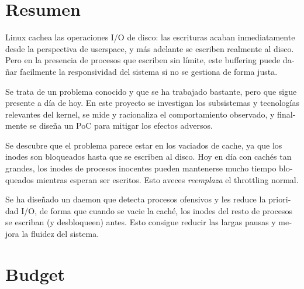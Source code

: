 \documentclass[a4paper,12pt]{article}
\begin{document}
\clearpage
{}
{}
\section*{Resumen}

\begin{otherlanguage}{spanish}
Linux cachea las operaciones I/O de disco: las escrituras acaban inmediatamente desde la perspectiva de userspace, y más adelante se escriben realmente al disco. Pero en la presencia de procesos que escriben sin límite, este buffering puede dañar facilmente la responsividad del sistema si no se gestiona de forma justa.

Se trata de un problema conocido y que se ha trabajado bastante, pero que sigue presente a día de hoy. En este proyecto se investigan los subsistemas y tecnologías relevantes del kernel, se mide y racionaliza el comportamiento observado, y finalmente se diseña un PoC para mitigar los efectos adversos.

Se descubre que el problema parece estar en los vaciados de cache, ya que los inodes son bloqueados hasta que se escriben al disco. Hoy en día con cachés tan grandes, los inodes de procesos inocentes pueden mantenerse mucho tiempo bloqueados mientras esperan ser escritos. Esto aveces \emph{reemplaza} el throttling normal.

Se ha diseñado un daemon que detecta procesos ofensivos y les reduce la prioridad I/O, de forma que cuando se vacie la caché, los inodes del resto de procesos se escriban (y desbloqueen) antes. Esto consigue reducir las largas pausas y mejora la fluidez del sistema.
\end{otherlanguage}


\clearpage


\newpage
{\hypersetup{linkcolor=black}
\tableofcontents
}

\newpage
{\hypersetup{linkcolor=black}
\listoffigures
\listoflistings
\listoftables
}


\newpage


\newpage


\newpage



\newpage


\clearpage
\section{Budget}
\end{document}

